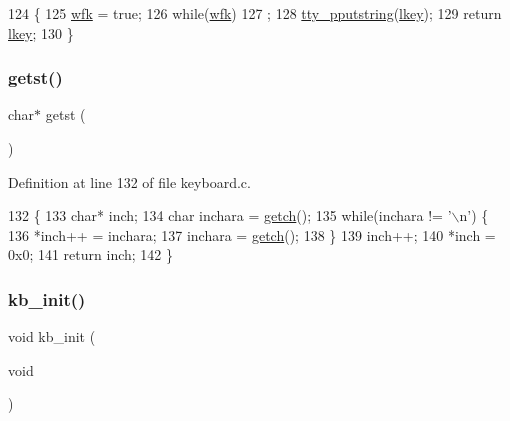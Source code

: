 \begin{DoxyCode}
124              \{
125     \hyperlink{a00029_a6ddd5223379778858edc46ffbec19775_a6ddd5223379778858edc46ffbec19775}{wfk} = \textcolor{keyword}{true};
126     \textcolor{keywordflow}{while}(\hyperlink{a00029_a6ddd5223379778858edc46ffbec19775_a6ddd5223379778858edc46ffbec19775}{wfk})
127         ;
128     \hyperlink{a00140_ade960b1320324706aac6c00cc6b1b2fe_ade960b1320324706aac6c00cc6b1b2fe}{tty\_pputstring}(\hyperlink{a00029_ade374650022cb30c4f5591a8dafad685_ade374650022cb30c4f5591a8dafad685}{lkey});
129     \textcolor{keywordflow}{return} \hyperlink{a00029_ade374650022cb30c4f5591a8dafad685_ade374650022cb30c4f5591a8dafad685}{lkey};
130 \}
\end{DoxyCode}
\mbox{\label{a00032_ab88a2e96bbe585e228a5b201435c0240_ab88a2e96bbe585e228a5b201435c0240}} 
\subsubsection{\texorpdfstring{getst()}{getst()}}
{\footnotesize\ttfamily char$\ast$ getst (\begin{DoxyParamCaption}{ }\end{DoxyParamCaption})}



Definition at line 132 of file keyboard.\+c.


\begin{DoxyCode}
132               \{
133     \textcolor{keywordtype}{char}* inch;
134     \textcolor{keywordtype}{char} inchara = \hyperlink{a00029_af3facad10e05defa48d45b46eb9ebe7e_af3facad10e05defa48d45b46eb9ebe7e}{getch}();
135     \textcolor{keywordflow}{while}(inchara != \textcolor{charliteral}{'\(\backslash\)n'}) \{
136         *inch++ = inchara;
137         inchara = \hyperlink{a00029_af3facad10e05defa48d45b46eb9ebe7e_af3facad10e05defa48d45b46eb9ebe7e}{getch}();
138     \}
139     inch++;
140     *inch = 0x0;
141     \textcolor{keywordflow}{return} inch;
142 \}
\end{DoxyCode}
\mbox{\label{a00032_aabdb223e5290f3b3c07bc82d075b87d7_aabdb223e5290f3b3c07bc82d075b87d7}} 
\subsubsection{\texorpdfstring{kb\+\_\+init()}{kb\_init()}}
{\footnotesize\ttfamily void kb\+\_\+init (\begin{DoxyParamCaption}\item[{void}]{ }\end{DoxyParamCaption})}



